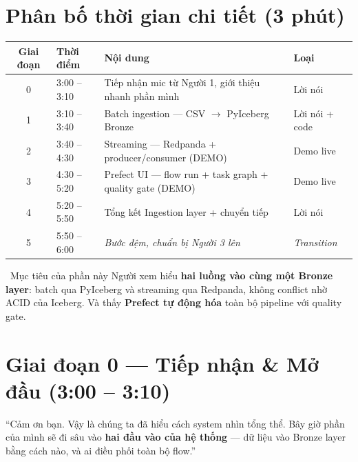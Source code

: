 \documentclass[12pt, a4paper]{article}
\newenvironment{speakerbox}[2]{%
  \begin{tcolorbox}[
    enhanced, breakable,
    colback=#1!6!white, colframe=#1,
    colbacktitle=#1, coltitle=white,
    fonttitle=\bfseries\large,
    title={#2},
    arc=4pt, boxrule=1.5pt,
    left=8pt, right=8pt, top=6pt, bottom=6pt,
  ]
}{\end{tcolorbox}}
\begin{document}
\newpage
\tableofcontents
\newpage

\section{Phân bố thời gian chi tiết (3 phút)}

\begin{center}
\renewcommand{\arraystretch}{1.6}
\begin{tabularx}{\textwidth}{clXl}
\toprule
\textbf{Giai đoạn} & \textbf{Thời điểm} & \textbf{Nội dung} & \textbf{Loại} \\
\midrule
0 & 3:00 -- 3:10 & Tiếp nhận mic từ Người 1, giới thiệu nhanh phần mình & Lời nói \\
1 & 3:10 -- 3:40 & Batch ingestion --- CSV $\to$ PyIceberg Bronze & Lời nói + code \\
2 & 3:40 -- 4:30 & Streaming --- Redpanda + producer/consumer (DEMO) & Demo live \\
3 & 4:30 -- 5:20 & Prefect UI --- flow run + task graph + quality gate (DEMO) & Demo live \\
4 & 5:20 -- 5:50 & Tổng kết Ingestion layer + chuyển tiếp & Lời nói \\
5 & 5:50 -- 6:00 & \textit{Bước đệm, chuẩn bị Người 3 lên} & \textit{Transition} \\
\bottomrule
\end{tabularx}
\end{center}

\begin{keybox}{\faLightbulb\ Mục tiêu của phần này}
Người xem hiểu \textbf{hai luồng vào cùng một Bronze layer}: batch qua PyIceberg và
streaming qua Redpanda, không conflict nhờ ACID của Iceberg.
Và thấy \textbf{Prefect tự động hóa} toàn bộ pipeline với quality gate.
\end{keybox}

\newpage

\section{Giai đoạn 0 --- Tiếp nhận \& Mở đầu (3:00 -- 3:10)}

\begin{speakerbox}{p2color}{\faUser\ Người 2 \textbullet\ 3:00 -- 3:10 \textbullet\ Tiếp nhận}

\begin{scriptbox}
``Cảm ơn bạn. Vậy là chúng ta đã hiểu cách system nhìn tổng thể. Bây giờ phần của
mình sẽ đi sâu vào \textbf{hai đầu vào của hệ thống} --- dữ liệu vào Bronze
layer bằng cách nào, và ai điều phối toàn bộ flow.''
\end{scriptbox}

\end{speakerbox}
\end{document}
